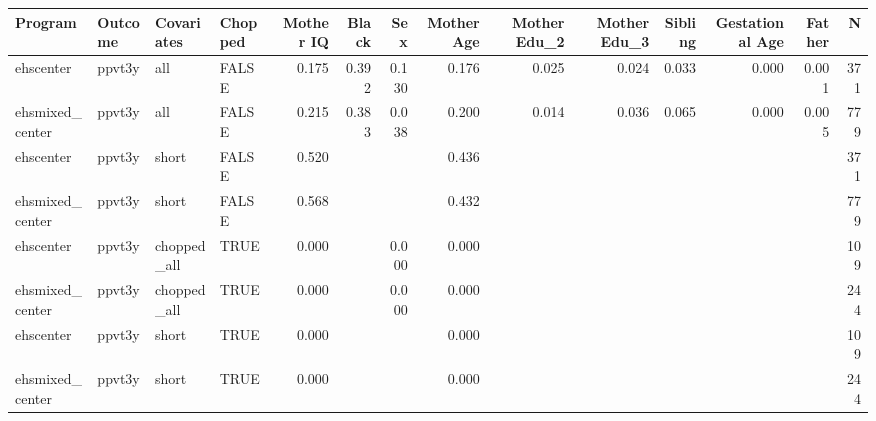 \begin{table}[ht]
\centering
\begin{tabular}{llllrrrrrrrrrr}
  \hline
Program & Outcome & Covariates & Chopped & Mother IQ & Black & Sex & Mother Age & Mother Edu\_2 & Mother Edu\_3 & Sibling & Gestational Age & Father & N \\ 
  \hline
ehscenter & ppvt3y & all & FALSE & 0.175 & 0.392 & 0.130 & 0.176 & 0.025 & 0.024 & 0.033 & 0.000 & 0.001 & 371 \\ 
  ehsmixed\_center & ppvt3y & all & FALSE & 0.215 & 0.383 & 0.038 & 0.200 & 0.014 & 0.036 & 0.065 & 0.000 & 0.005 & 779 \\ 
  ehscenter & ppvt3y & short & FALSE & 0.520 &  &  & 0.436 &  &  &  &  &  & 371 \\ 
  ehsmixed\_center & ppvt3y & short & FALSE & 0.568 &  &  & 0.432 &  &  &  &  &  & 779 \\ 
  ehscenter & ppvt3y & chopped\_all & TRUE & 0.000 &  & 0.000 & 0.000 &  &  &  &  &  & 109 \\ 
  ehsmixed\_center & ppvt3y & chopped\_all & TRUE & 0.000 &  & 0.000 & 0.000 &  &  &  &  &  & 244 \\ 
  ehscenter & ppvt3y & short & TRUE & 0.000 &  &  & 0.000 &  &  &  &  &  & 109 \\ 
  ehsmixed\_center & ppvt3y & short & TRUE & 0.000 &  &  & 0.000 &  &  &  &  &  & 244 \\ 
   \hline
\end{tabular}
\end{table}
